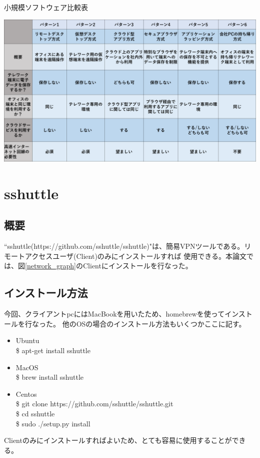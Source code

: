 \documentclass[11pt,a4j,titlepage]{jreport}
\begin{document}
\begin{table}[H]
    \centering
    \caption{小規模ソフトウェア比較表}
    \includegraphics*[width=1.0\textwidth,page=4]{graphs/telework_list.pdf}
    \label{shoukibo}
\end{table}




\section{sshuttle}\label{sshuttle}
\subsection*{概要}
``sshuttle(https://github.com/sshuttle/sshuttle)"は、簡易VPNツールである。リモートアクセスユーザ(Client)のみにインストールすれば
    使用できる。本論文では、図\ref{network_graph}のClientにインストールを行なった。
\subsection*{インストール方法}
今回、クライアントpcにはMacBookを用いたため、homebrewを使ってインストールを行なった。
他のOSの場合のインストール方法もいくつかここに記す。
\begin{itemize}
    \item Ubuntu \mbox{}\\ \$ apt-get install sshuttle
    \item MacOS \mbox{}\\ \$ brew install sshuttle
    \item Centos \mbox{}\\  \$ git clone https://github.com/sshuttle/sshuttle.git\\\$ cd sshuttle \\ \$ sudo ./setup.py install 
\end{itemize}
Clientのみにインストールすればよいため、とても容易に使用することができる。
\end{document}
